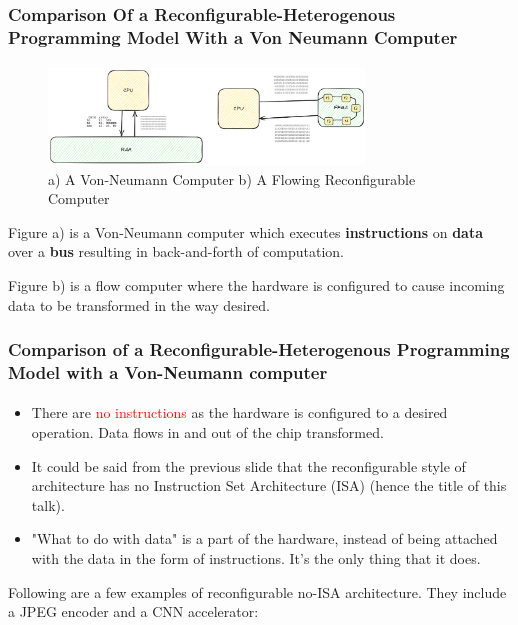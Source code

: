 \documentclass{beamer}
\begin{document}
{\begin{frame}[fragile]
  \frametitle{Comparison Of a Reconfigurable-Heterogenous Programming Model With a Von Neumann
  Computer}
  \framesubtitle{}
  \begin{figure}
    \centering
    \includegraphics[width=0.75\textwidth]{flow.png}
    \caption{a) A Von-Neumann Computer b) A Flowing Reconfigurable Computer}
    \label{}
  \end{figure}
  Figure a) is a Von-Neumann computer which executes
  \textbf{instructions} on \textbf{data} over a \textbf{bus} resulting in
  back-and-forth of computation. 

  Figure b) is a flow computer where the
  hardware is configured to cause incoming data to be transformed in the
  way desired. 
\end{frame}

\begin{frame}[fragile]
  \frametitle{Comparison of a Reconfigurable-Heterogenous Programming Model with a Von-Neumann
  computer}
  \framesubtitle{}

  \begin{itemize}
    \item There are \textcolor{red}{no instructions} as the hardware
  is configured to a desired operation. Data flows in and out
  of the chip transformed. 

\item It could be said from the previous slide that the reconfigurable style of
  architecture has no Instruction Set Architecture (ISA) (hence the title
  of this talk). 

\item "What to do with data" is a part of the hardware, instead
  of being attached with the data in the form of instructions. It's the
  only thing that it does.
  \end{itemize}
  Following are a few examples of reconfigurable no-ISA architecture. They
  include a JPEG encoder and a CNN accelerator:
\end{frame}



}
\end{document}
